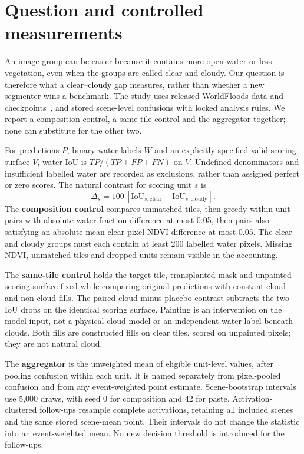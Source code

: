 \section{Question and controlled measurements}
\label{sec:controls}
An image group can be easier because it contains more open water or less vegetation, even when the groups are called clear and cloudy.
Our question is therefore what a clear--cloudy gap measures, rather than whether a new segmenter wins a benchmark.
The study uses released WorldFloods data and checkpoints~\cite{worldfloods,prithvi}, and stored scene-level confusions with locked analysis rules.
We report a composition control, a same-tile control and the aggregator together; none can substitute for the other two.

For predictions $P$, binary water labels $W$ and an explicitly specified valid scoring surface $V$, water IoU is $TP/(TP+FP+FN)$ on $V$.
Undefined denominators and insufficient labelled water are recorded as exclusions, rather than assigned perfect or zero scores.
The natural contrast for scoring unit $s$ is
\begin{equation}
 \Delta_s=100\,[\mathrm{IoU}_{s,\mathrm{clear}}-\mathrm{IoU}_{s,\mathrm{cloudy}}].
\end{equation}
The \textbf{composition control} compares unmatched tiles, then greedy within-unit pairs with absolute water-fraction difference at most 0.05, then pairs also satisfying an absolute mean clear-pixel NDVI difference at most 0.05.
The clear and cloudy groups must each contain at least 200 labelled water pixels.
Missing NDVI, unmatched tiles and dropped units remain visible in the accounting.

The \textbf{same-tile control} holds the target tile, transplanted mask and unpainted scoring surface fixed while comparing original predictions with constant cloud and non-cloud fills.
The paired cloud-minus-placebo contrast subtracts the two IoU drops on the identical scoring surface.
Painting is an intervention on the model input, not a physical cloud model or an independent water label beneath clouds.
Both fills are constructed fills on clear tiles, scored on unpainted pixels; they are not natural cloud.

The \textbf{aggregator} is the unweighted mean of eligible unit-level values, after pooling confusion within each unit.
It is named separately from pixel-pooled confusion and from any event-weighted point estimate.
Scene-bootstrap intervals use 5,000 draws, with seed 0 for composition and 42 for paste.
Activation-clustered follow-ups resample complete activations, retaining all included scenes and the same stored scene-mean point.
Their intervals do not change the statistic into an event-weighted mean.
No new decision threshold is introduced for the follow-ups.
